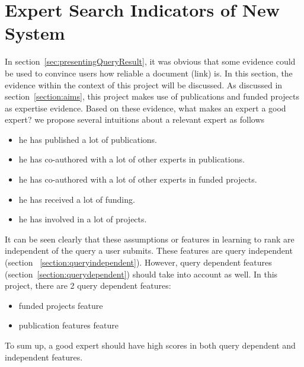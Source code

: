 \section{Expert Search Indicators of New System}\label{section:goodexpert}
In section~\ref{sec:presentingQueryResult}, it was obvious that some evidence could be used to convince users how reliable a document (link) is.
In this section, the evidence within
the context of this project will be discussed. As discussed in section~\ref{section:aims}, this project makes use of publications and funded projects as 
expertise evidence. Based on these evidence, what makes an expert a good expert? we propose several intuitions about a relevant expert as follows 
\begin{itemize}
 \item he has published a lot of publications.
 \item he has co-authored with a lot of other experts in publications.
 \item he has co-authored with a lot of other experts in funded projects.
 \item he has received a lot of funding.
 \item he has involved in a lot of projects.
\end{itemize}

It can be seen clearly that these assumptions or features in learning to rank are independent of the query a user submits. These features are query independent
(section ~\ref{section:queryindependent}). However, query dependent features (section~\ref{section:querydependent}) should take into account as well. 
In this project, there are 2 query dependent features: 
\begin{itemize}
 \item funded projects feature
 \item publication features feature
\end{itemize}

To sum up, a good expert should have high scores in both query dependent and independent features.

